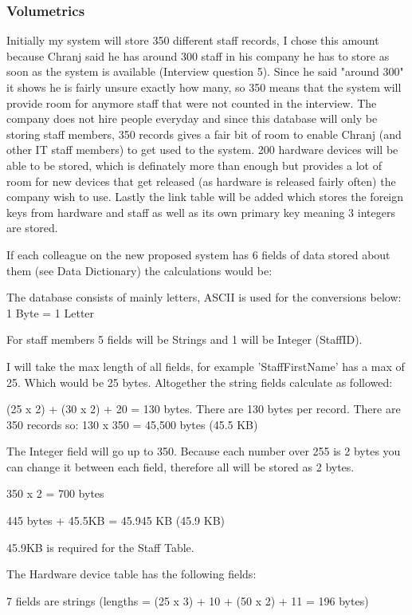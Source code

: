 \subsubsection{Volumetrics}

Initially my system will store 350 different staff records, I chose this amount because Chranj said he has around 300 staff in his company he has to store as soon as the system is available (Interview question 5). Since he said "around 300" it shows he is fairly unsure exactly how many, so 350 means that the system will provide room for anymore staff that were not counted in the interview. The company does not hire people everyday and since this database will only be storing staff members, 350 records gives a fair bit of room to enable Chranj (and other IT staff members) to get used to the system. 200 hardware devices will be able to be stored, which is definately more than enough but provides a lot of room for new devices that get released (as hardware is released fairly often) the company wish to use. Lastly the link table will be added which stores the foreign keys from hardware and staff as well as its own primary key meaning 3 integers are stored.

If each colleague on the new proposed system has 6 fields of data stored about them (see Data Dictionary) the calculations would be:


The database consists of mainly letters, ASCII is used for the conversions below:
1 Byte = 1 Letter

For staff members 5 fields will be Strings and 1 will be Integer (StaffID).


I will take the max length of all fields, for example 'StaffFirstName' has a max of 25. Which would be 25 bytes. Altogether the string fields calculate as followed:

(25 x 2) + (30 x 2) + 20 = 130 bytes. 
There are 130 bytes per record.
There are 350 records so:
130 x 350 = 45,500 bytes (45.5 KB)

The Integer field will go up to 350. Because each number over 255 is 2 bytes you can change it between each field, therefore all will be stored as 2 bytes.

350 x 2 = 700 bytes

445 bytes + 45.5KB =  45.945 KB (45.9 KB) 

45.9KB is required for the Staff Table.

The Hardware device table has the following fields:

7 fields are strings (lengths = (25 x 3) + 10 + (50 x 2) + 11 = 196 bytes)

